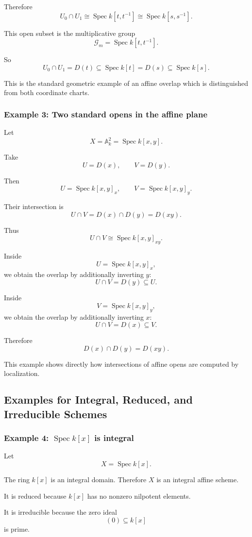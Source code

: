 \documentclass[12pt,a4paper]{article}
\DeclareMathOperator{\Spec}{Spec}
\newcommand{\G}{\mathcal G}
\providecommand{\Spec}{\operatorname{Spec}}
\providecommand{\A}{\mathbb A}
\providecommand{\G}{\mathbb G}
\theoremstyle{notespace}
\begin{document}
Therefore
\[
U_0\cap U_1
\cong
\Spec k[t,t^{-1}]
\cong
\Spec k[s,s^{-1}].
\]

This open subset is the multiplicative group
\[
\G_m=\Spec k[t,t^{-1}].
\]

So
\[
\boxed{
	U_0\cap U_1
	=
	D(t)\subseteq \Spec k[t]
	=
	D(s)\subseteq \Spec k[s].
}
\]

This is the standard geometric example of an affine overlap which is distinguished from both coordinate charts.

\subsubsection*{Example 3: Two standard opens in the affine plane}

Let
\[
X=\A^2_k=\Spec k[x,y].
\]

Take
\[
U=D(x),
\qquad
V=D(y).
\]

Then
\[
U=\Spec k[x,y]_x,
\qquad
V=\Spec k[x,y]_y.
\]

Their intersection is
\[
U\cap V
=
D(x)\cap D(y)
=
D(xy).
\]

Thus
\[
U\cap V
\cong
\Spec k[x,y]_{xy}.
\]

Inside
\[
U=\Spec k[x,y]_x,
\]
we obtain the overlap by additionally inverting \(y\):
\[
U\cap V=D(y)\subseteq U.
\]

Inside
\[
V=\Spec k[x,y]_y,
\]
we obtain the overlap by additionally inverting \(x\):
\[
U\cap V=D(x)\subseteq V.
\]

Therefore
\[
\boxed{
	D(x)\cap D(y)=D(xy).
}
\]

This example shows directly how intersections of affine opens are computed by localization.

\subsection{Examples for Integral, Reduced, and Irreducible Schemes}

\subsubsection*{Example 4: \(\Spec k[x]\) is integral}

Let
\[
X=\Spec k[x].
\]

The ring \(k[x]\) is an integral domain. Therefore \(X\) is an integral affine scheme.

It is reduced because \(k[x]\) has no nonzero nilpotent elements.

It is irreducible because the zero ideal
\[
(0)\subseteq k[x]
\]
is prime.
\end{document}
